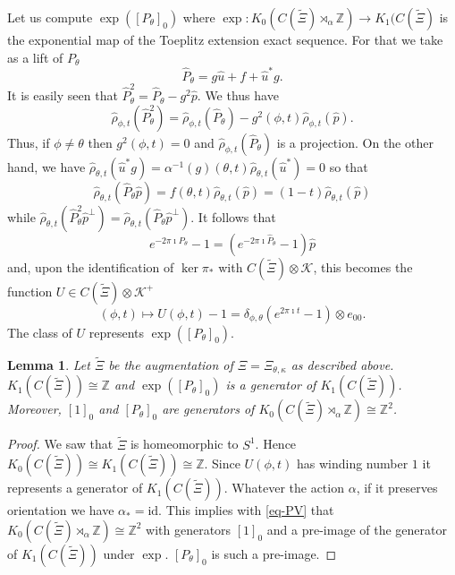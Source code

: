 \documentclass[11pt]{amsart}
\newtheorem{lemma}{Lemma}[section]
\newcommand{\Z}{\mathbb{Z}}
\newcommand{\cut}{\kappa}
\begin{document}
Let us compute $\exp([P_\theta]_0)$ where $\exp:K_0(C(\tilde\Xi)\rtimes_\alpha\Z)\to K_1(C(\tilde \Xi)$ is the exponential map of the Toeplitz extension exact sequence. For that we take as a lift of $P_\theta$ 
	$$\hat P_\theta = g\hat u+f +\hat u^* g.$$
It is easily seen that $\hat P_\theta^2 = \hat P_\theta - g^2 \hat p$.
We thus have
$$\hat\rho_{\phi,t}(\hat P_\theta^2) = \hat\rho_{\phi,t}(\hat P_\theta) - g^2(\phi,t) \hat\rho_{\phi,t}(\hat p).$$
Thus, if $\phi\neq \theta$ then $g^2(\phi,t)=0$ and $\hat\rho_{\phi,t}(\hat P_\theta)$ is a projection. On the other hand, we have $\hat\rho_{\theta,t}(\hat u^* g) = \alpha^{-1}(g)(\theta,t) \hat\rho_{\theta,t}(\hat u^*) = 0$ so that
$$\hat\rho_{\theta,t}(\hat P_\theta \hat p) = f(\theta,t)  \hat\rho_{\theta,t}( \hat p) = (1-t) \hat\rho_{\theta,t}( \hat p)$$
while $\hat\rho_{\theta,t}(\hat P_\theta^2 \hat p^\perp) = \hat\rho_{\theta,t}(\hat P_\theta \hat p^\perp)$. It follows that
$$e^{-2\pi \imath \hat P_\theta} - 1 = (e^{-2\pi \imath \hat P_\theta} - 1)\hat p$$
and, upon the identification of $\ker \pi_*$ with $C(\tilde\Xi)\otimes\mathcal K$, this becomes the function $U\in C(\tilde\Xi)\otimes\mathcal K^+$
\begin{equation}\label{eq-U}
(\phi,t)\mapsto  U(\phi,t)-1 = \delta_{\phi,\theta}(e^{2\pi \imath t}  - 1) \otimes e_{00}.
\end{equation}
The class of $U$ represents $\exp([P_\theta]_0)$.
\begin{lemma}\label{lem-K-aug}
	Let $\tilde\Xi$ be the augmentation of $\Xi=\Xi_{\theta,\cut}$ as described above. 
$K_1(C(\tilde\Xi))\cong \Z$ and $\exp([P_\theta]_0)$ is a generator of $K_1(C(\tilde\Xi))$.
Moreover, $[1]_0$ and $[P_\theta]_0$ are generators of $K_0(C(\tilde\Xi)\rtimes_\alpha\Z)\cong\Z^2$.
\end{lemma}
\begin{proof} 
We saw that $\tilde{\Xi}$ is homeomorphic to $S^1$. Hence $K_0(C(\tilde{\Xi}))\cong K_1(C(\tilde{\Xi}))\cong\Z$. Since $U(\phi,t)$ has winding number $1$ it represents a generator of $K_1(C(\tilde{\Xi}))$. Whatever the action $\alpha$, if it preserves orientation we have $\alpha_*=\mathrm{id}$. This implies with \eqref{eq-PV} that $K_0(C(\tilde{\Xi})\rtimes_\alpha\Z)\cong \Z^2$ with generators $[1]_0$ and a pre-image of the generator of  	$K_1(C(\tilde{\Xi}))$ under $\exp$. $[P_\theta]_0$ is such a pre-image.
\end{proof}


\end{document}
